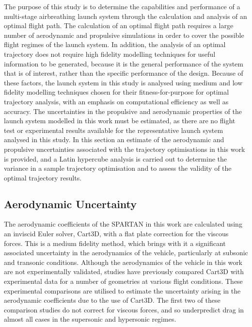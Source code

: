 The purpose of this study is to determine the capabilities and performance of a multi-stage airbreathing launch system through the calculation and analysis of an optimal flight path. The calculation of an optimal flight path requires a large number of aerodynamic and propulsive simulations in order to cover the possible flight regimes of the launch system. In addition, the analysis of an optimal trajectory does not require high fidelity modelling techniques for useful information to be generated, because it is the general performance of the system that is of interest, rather than the specific performance of the design. Because of these factors, the launch system in this study is analysed using medium and low fidelity modelling techniques chosen for their fitness-for-purpose for optimal trajectory analysis, with an emphasis on computational efficiency as well as accuracy.
The uncertainties in the propulsive and aerodynamic properties of the launch system modelled in this work must be estimated, as there are no flight test or experimental results available for the representative launch system analysed in this study. In this section an estimate of the aerodynamic and propulsive uncertainties associated with the trajectory optimisations in this work is provided, and a Latin hypercube analysis is carried out to determine the variance in a sample trajectory optimisation and to assess the validity of the optimal trajectory results. 

\subsection{Aerodynamic Uncertainty}\label{sec:aerounc}



The aerodynamic coefficients of the SPARTAN in this work are calculated using an inviscid Euler solver, Cart3D, with a flat plate correction for the viscous forces. This is a medium fidelity method, which brings with it a significant associated uncertainty in the aerodynamics of the vehicle, particularly at subsonic and transonic conditions. Although the aerodynamics of the vehicle in this work are not experimentally validated, studies have previously compared Cart3D with experimental data for a number of geometries at various flight conditions. These experimental comparisons are utilised to estimate the uncertainty arising in the aerodynamic coefficients due to the use of Cart3D. The first two of these comparison studies do not correct for viscous forces, and so underpredict drag in almost all cases in the supersonic and hypersonic regimes.




